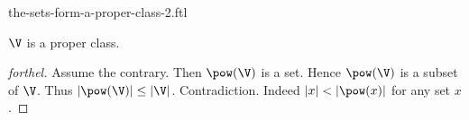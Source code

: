 \documentclass{naproche-library}
\begin{document}
\begin{smodule}[title=The Sets Form a Proper Class -- Cantor's Second Paradox]{the-sets-form-a-proper-class-2.ftl}

\begin{theorem}[forthel,title=Cantor's Second Paradox,id=cantor_paradox_2]
  $\V$ is a proper class.
\end{theorem}
\begin{proof}[forthel]
  Assume the contrary.
  Then $\pow(\V)$ is a set.
  Hence $\pow(\V)$ is a subset of $\V$.
  Thus $|\pow(\V)| \leq |\V|$.
  Contradiction.
  Indeed $|x| < |\pow(x)|$ for any set $x$.
\end{proof}
\end{smodule}
\end{document}
